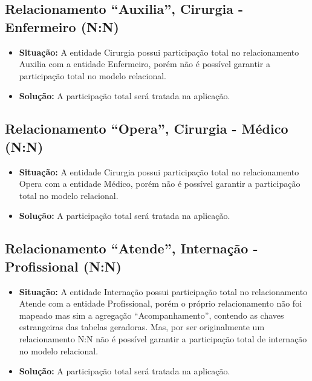 \documentclass[12pt, a4paper]{article}
\begin{document}
\subsection{Relacionamento “Auxilia”, Cirurgia - Enfermeiro (N:N)}
\begin{itemize}
    \item \textbf{Situação:} A entidade Cirurgia possui participação total no relacionamento Auxilia com a
entidade Enfermeiro, porém não é possível garantir a participação total no modelo
relacional.

    \item \textbf{Solução:} A participação total será tratada na aplicação.

\end{itemize}

\subsection{Relacionamento “Opera”, Cirurgia - Médico (N:N)}
\begin{itemize}
    \item \textbf{Situação:} A entidade Cirurgia possui participação total no relacionamento Opera com a
entidade Médico, porém não é possível garantir a participação total no modelo relacional.

    \item \textbf{Solução:} A participação total será tratada na aplicação.

\end{itemize}

\subsection{Relacionamento “Atende”, Internação - Profissional (N:N)}
\begin{itemize}
    \item \textbf{Situação:} A entidade Internação possui participação total no relacionamento Atende com
a entidade Profissional, porém o próprio relacionamento não foi mapeado mas sim a
agregação “Acompanhamento”, contendo as chaves estrangeiras das tabelas geradoras.
Mas, por ser originalmente um relacionamento N:N não é possível garantir a participação
total de internação no modelo relacional.

    \item \textbf{Solução:} A participação total será tratada na aplicação.

\end{itemize}
\end{document}
